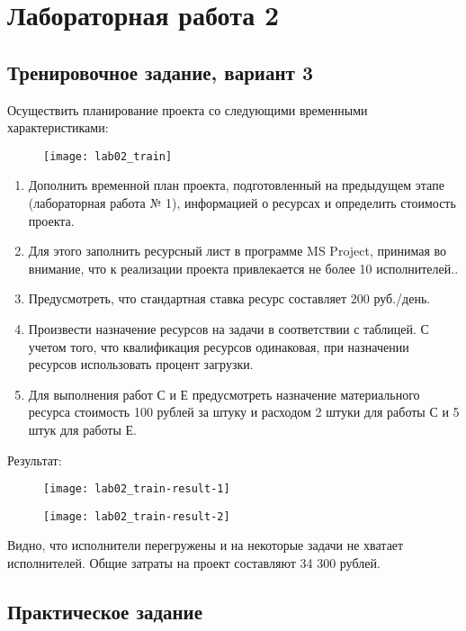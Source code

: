 \chapter{Лабораторная работа 2}
\section*{Тренировочное задание, вариант 3}

Осуществить планирование проекта со следующими временными характеристиками:

\begin{figure}[h!]
	\texttt{[image: lab02\_train]}
\end{figure}

\begin{enumerate}
	\item Дополнить временной план проекта, подготовленный на предыдущем этапе (лабораторная работа № 1), информацией о ресурсах и определить стоимость проекта.
	\item Для этого заполнить ресурсный лист в программе MS Project, принимая во внимание, что к реализации проекта привлекается не более 10 исполнителей..
	\item Предусмотреть, что стандартная ставка ресурс составляет 200 руб./день.
	\item Произвести назначение ресурсов на задачи в соответствии с таблицей. С учетом того, что квалификация ресурсов одинаковая, при назначении ресурсов использовать процент загрузки.
	\item Для выполнения работ С и Е предусмотреть назначение материального ресурса стоимость 100 рублей за штуку и расходом 2 штуки для работы С и 5 штук для работы Е.
\end{enumerate}

Результат:

\begin{figure}[h!]
	\texttt{[image: lab02\_train-result-1]}
\end{figure}

\begin{figure}[h!]
	\texttt{[image: lab02\_train-result-2]}
\end{figure}

Видно, что исполнители перегружены и на некоторые задачи не хватает исполнителей. Общие затраты на проект составляют 34 300 рублей.

\clearpage
\section*{Практическое задание}

